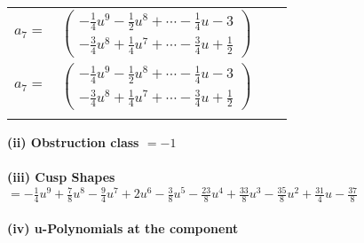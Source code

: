 \documentclass[1p]{elsarticle_modified}
\theoremstyle{definition}
\begin{document}
\begin{tabular}{m{7pt} m{180pt} m{7pt} m{180pt} }
\flushright $a_{7}=$&$\begin{pmatrix}-\frac{1}{4} u^9-\frac{1}{2} u^8+\cdots-\frac{1}{4} u-3\\-\frac{3}{4} u^8+\frac{1}{4} u^7+\cdots-\frac{3}{4} u+\frac{1}{2}\end{pmatrix}$\\ \flushright $a_{7}=$&$\begin{pmatrix}-\frac{1}{4} u^9-\frac{1}{2} u^8+\cdots-\frac{1}{4} u-3\\-\frac{3}{4} u^8+\frac{1}{4} u^7+\cdots-\frac{3}{4} u+\frac{1}{2}\end{pmatrix}$\\&\end{tabular}
\flushleft \textbf{(ii) Obstruction class $= -1$}\\~\\
\flushleft \textbf{(iii) Cusp Shapes $= -\frac{1}{4} u^9+\frac{7}{8} u^8-\frac{9}{4} u^7+2 u^6-\frac{3}{8} u^5-\frac{23}{8} u^4+\frac{33}{8} u^3-\frac{35}{8} u^2+\frac{31}{4} u-\frac{37}{8}$}\\~\\
\newpage\renewcommand{\arraystretch}{1}
\flushleft \textbf{(iv) u-Polynomials at the component}\newline \\
\end{document}
